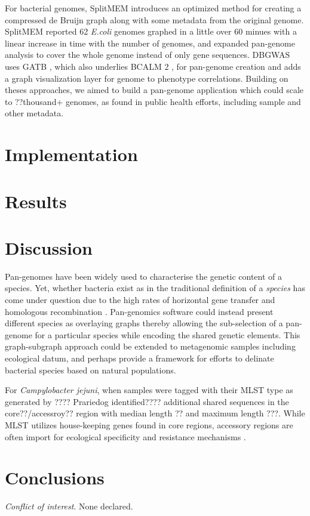\documentclass{article}
\begin{document}
For bacterial genomes, SplitMEM \cite{marcus2014splitmem} introduces an optimized method for creating a compressed de Bruijn graph along with some metadata from the original genome.
SplitMEM reported 62 \textit{E.coli} genomes graphed in a little over 60 minues with a linear increase in time with the number of genomes, and expanded pan-genome analysis to cover the whole genome instead of only gene sequences.
DBGWAS \cite{jaillard2018fast} uses GATB \cite{drezen2014gatb}, which also underlies BCALM 2 \cite{chikhi2016compacting}, for pan-genome creation and adds a graph visualization layer for genome to phenotype correlations.
Building on theses approaches, we aimed to build a pan-genome application which could scale to ??thousand+ genomes, as found in public health efforts, including sample and other metadata.

\section{Implementation}

\section{Results}

\section{Discussion}

Pan-genomes have been widely used to characterise the genetic content of a species.
Yet, whether bacteria exist as in the traditional definition of a \textit{species} has come under question due to the high rates of horizontal gene transfer and homologous recombination \cite{fraser2009bacterial}.
Pan-genomics software could instead present different species as overlaying graphs thereby allowing the sub-selection of a pan-genome for a particular species while encoding the shared genetic elements.
This graph-subgraph approach could be extended to metagenomic samples including ecological datum, and perhaps provide a framework for efforts \cite{caro2012bacterial} to delinate bacterial species based on natural populations.


For \textit{Campylobacter jejuni}, when samples were tagged with their MLST type as generated by ???? Prariedog identified???? additional shared sequences in the core??/accessroy?? region with median length ?? and maximum length ???. %
While MLST utilizes house-keeping genes found in core regions, accessory regions are often import for ecological specificity and resistance mechanisms \cite{fraser2009bacterial}.

\section{Conclusions}


\textit{Conflict of interest}. None declared.

\newpage



\end{document}
